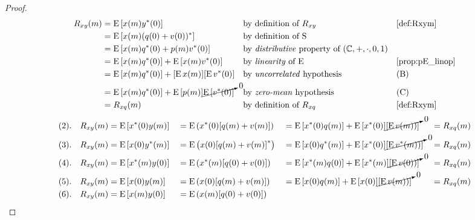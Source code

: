 \begin{proof}
\begin{align*}
  \Rxy(m)
    &\eqd \pE\brs{\rvx(m)\rvy^\ast(0)}
    && \text{by definition of $\Rxy$}
    && \text{\xref{def:Rxym}}
  \\&\eqd \pE\brs{\rvx(m)(\rvq(0)+\rvv(0))^\ast}
    && \text{by definition of $\opS$}
  \\&= \pE\brs{\rvx(m)\rvq^\ast(0)+\rvp(m)\rvv^\ast(0)}
    && \text{by \prope{distributive} property of $\fieldC$}
  \\&= \pE\brs{\rvx(m)\rvq^\ast(0)} + \pE\brs{\rvx(m)\rvv^\ast(0)}
    && \text{by \prope{linearity} of $\pE$}
    && \text{\xref{prop:pE_linop}}
  \\&= \pE\brs{\rvx(m)\rvq^\ast(0)} + \brs{\pE\rvx(m)}\brs{\pE\rvv^\ast(0)}
    && \text{by \prope{uncorrelated} hypothesis}
    && \text{(B)}
  \\&= \pE\brs{\rvx(m)\rvq^\ast(0)} + \pE\brs{\rvp(m)}\cancelto{0}{\pE\brs{\rvv^\ast(0)}}
    && \text{by \prope{zero-mean} hypothesis}
    && \text{(C)}
  \\&= \Rxq(m)
    && \text{by definition of $\Rxq$}
    && \text{\xref{def:Rxym}}
\end{align*}
\begin{align*}
    (2).\quad\Rxy(m)
       &\eqd \pE\brs{\rvx^\ast(0) \rvy(m)}
      &&\eqd \pE\brp{\rvx^\ast(0) \brs{\rvq(m) + \rvv(m)}}
      &&\eqd \pE\brs{\rvx^\ast(0) \rvq(m)} + \pE\brs{\rvx^\ast(0)}\cancelto{0}{\brs{\pE{\rvv(m))}}}
      &&=    \Rxq(m)
     \\
    (3).\quad\Rxy(m)
       &\eqd \pE\brs{\rvx(0)\rvy^\ast(m)}
      &&\eqd \pE\brp{\rvx(0) \brs{\rvq(m) + \rvv(m)}^\ast}
      &&\eqd \pE\brs{\rvx(0) \rvq^\ast(m)} + \pE\brs{\rvx^\ast(0)}\cancelto{0}{\brs{\pE{\rvv^\ast(m))}}}
      &&=    \Rxq(m)
     \\
    (4).\quad\Rxy(m)
      &\eqd \pE\brs{\rvx^\ast(m)\rvy(0)}
      &&\eqd \pE\brp{\rvx^\ast(m) \brs{\rvq(0) + \rvv(0)}}
      &&\eqd \pE\brs{\rvx^\ast(m) \rvq(0)} + \pE\brs{\rvx^\ast(m)}\cancelto{0}{\brs{\pE{\rvv(0))}}}
      &&=    \Rxq(m)
     \\
    (5).\quad\Rxy(m)
      &\eqd \pE\brs{\rvx(0)\rvy(m)}
      &&\eqd \pE\brp{\rvx(0) \brs{\rvq(m) + \rvv(m)}}
      &&\eqd \pE\brs{\rvx(0) \rvq(m)} + \pE\brs{\rvx(0)}\cancelto{0}{\brs{\pE{\rvv(m))}}}
      &&=    \Rxq(m)
     \\
    (6).\quad\Rxy(m)
      &\eqd \pE\brs{\rvx(m)\rvy(0)}
      &&\eqd \pE\brp{\rvx(m) \brs{\rvq(0) + \rvv(0)}}

\end{align*}
\end{proof}
